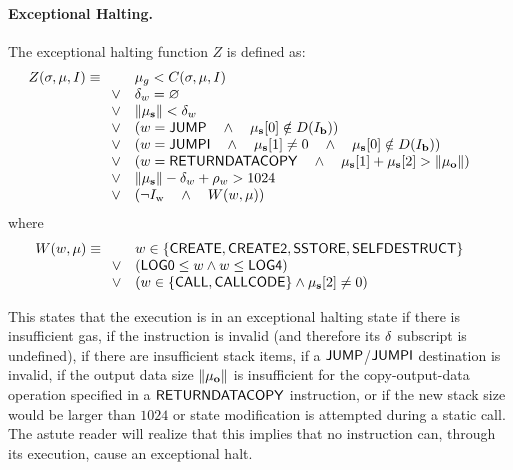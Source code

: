 \paragraph{Exceptional Halting.}\hypertarget{Exceptional_Halting_function_Z}{}
%
The exceptional halting function $Z$ is defined as:
\begin{equation}
	Z(\mathbf{\sigma}, \mathbf{\mu}, I) \equiv
	\begin{array}[t]{ll}
		& \mathbf{\mu}_g < C(\mathbf{\sigma}, \mathbf{\mu}, I) \quad \\
		\vee & \mathbf{\delta}_w = \varnothing \quad \\
		\vee & \lVert\mathbf{\mu}_\mathbf{s}\rVert < \mathbf{\delta}_w \quad \\
		\vee & \left( w =  \mathsf{JUMP} \quad \wedge \quad \mathbf{\mu}_\mathbf{s}[0] \notin D(I_\mathbf{b})  \right) \quad \\
		\vee & \left( w =  \mathsf{JUMPI} \quad \wedge \quad \mathbf{\mu}_\mathbf{s}[1] \neq 0 \quad \wedge \quad \mathbf{\mu}_\mathbf{s}[0] \notin D(I_\mathbf{b})  \right) \quad \\
		\vee & \left( w = \mathsf{RETURNDATACOPY} \quad \wedge \quad \mathbf{\mu}_{\mathbf{s}}[1] + \mathbf{\mu}_{\mathbf{s}}[2] > \lVert\mathbf{\mu}_{\mathbf{o}}\rVert \right) \quad \\
		\vee & \lVert\mathbf{\mu}_\mathbf{s}\rVert - \mathbf{\delta}_w + \mathbf{\rho}_w > 1024 \quad\\ 
		\vee & \left(\neg I_{\mathrm{w}} \quad \wedge \quad W(w, \mathbf{\mu})\right)
	\end{array}
\end{equation}
where
\begin{equation}
W(w, \mathbf{\mu}) \equiv \\
\begin{array}[t]{ll}
	& w \in \{ \mathsf{CREATE},  \mathsf{CREATE2},  \mathsf{SSTORE}, \mathsf{SELFDESTRUCT}\} \quad \\
	\vee & \left(\mathsf{LOG0} \le w \wedge w \le  \mathsf{LOG4} \right)\\
	\vee & \left(w \in \{ \mathsf{CALL},  \mathsf{CALLCODE}\} \wedge \mathbf{\mu}_{\mathbf{s}}[2] \neq 0\right)
\end{array}
\end{equation}

This states that the execution is in an exceptional halting state if there is insufficient gas, if the instruction is invalid (and therefore its $\mathbf{\delta}$ subscript is undefined), if there are insufficient stack items, if a $\mathsf{JUMP}$/$\mathsf{JUMPI}$ destination is invalid, 
if the output data size $\lVert\mathbf{\mu}_{\mathbf{o}}\rVert$ is insufficient for the copy-output-data operation specified in a $\mathsf{RETURNDATACOPY}$ instruction,
or if the new stack size would be larger than $1024$ or state modification is attempted during a static call. The astute reader will realize that this implies that no instruction can, through its execution, cause an exceptional halt.

